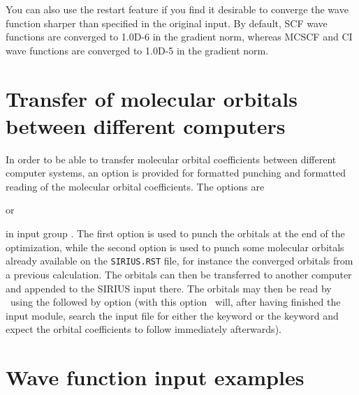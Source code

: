 \noindent
You can also use the restart feature if you find it desirable to
converge the wave function sharper
than specified in the original input. By default, SCF wave
functions are converged to 1.0D-6 in the gradient norm, whereas MCSCF
and CI wave functions are converged to 1.0D-5 in the gradient norm. 

\pagebreak[2]
\section{\label{sec:ig_orbtransfer}
Transfer of molecular orbitals between different computers}

In order to be able to transfer molecular orbital coefficients between
different computer systems,
an option is provided for
formatted punching and formatted reading of the molecular orbital
coefficients.  The options are
\begin{center}
    or 
\end{center}
in input group . The first option is used to
punch the orbitals at the end of the optimization, while the
second option is used to punch some molecular
orbitals already available on the \verb|SIRIUS.RST|
file, for instance the converged
orbitals from a previous calculation.  The orbitals can then be
transferred to another computer and appended to the SIRIUS input
there. The orbitals may then be read by \siraba\ using the
 followed by  option  (with this option
\siraba\ will, after having finished the 
input module, search the input file for either the 
keyword or the  keyword and expect the orbital
coefficients to follow immediately afterwards).


\section{\label{examples} Wave function input examples}

